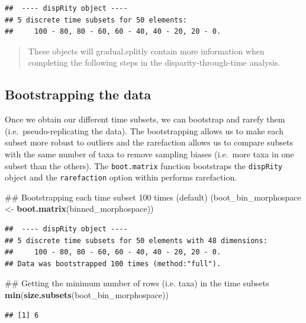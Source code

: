 \documentclass[]{book}
\newenvironment{Shaded}{\begin{snugshade}}{\end{snugshade}}
\newcommand{\KeywordTok}[1]{\textcolor[rgb]{0.13,0.29,0.53}{\textbf{#1}}}
\newcommand{\StringTok}[1]{\textcolor[rgb]{0.31,0.60,0.02}{#1}}
\newcommand{\NormalTok}[1]{#1}
\theoremstyle{definition}
\theoremstyle{definition}
\theoremstyle{definition}
\theoremstyle{remark}
\begin{document}
\begin{verbatim}
##  ---- dispRity object ---- 
## 5 discrete time subsets for 50 elements:
##     100 - 80, 80 - 60, 60 - 40, 40 - 20, 20 - 0.
\end{verbatim}

\begin{quote}
These objects will gradual.splitly contain more information when
completing the following steps in the disparity-through-time analysis.
\end{quote}

\subsection{Bootstrapping the data}\label{bootstrapping-the-data}

Once we obtain our different time subsets, we can bootstrap and rarefy
them (i.e.~pseudo-replicating the data). The bootstrapping allows us to
make each subset more robust to outliers and the rarefaction allows us
to compare subsets with the same number of taxa to remove sampling
biases (i.e.~more taxa in one subset than the others). The
\texttt{boot.matrix} function bootstraps the \texttt{dispRity} object
and the \texttt{rarefaction} option within performs rarefaction.

\begin{Shaded}
\begin{Highlighting}[]
\NormalTok{## Bootstrapping each time subset 100 times (default)}
\NormalTok{(boot_bin_morphospace <-}\StringTok{ }\KeywordTok{boot.matrix}\NormalTok{(binned_morphospace))}
\end{Highlighting}
\end{Shaded}

\begin{verbatim}
##  ---- dispRity object ---- 
## 5 discrete time subsets for 50 elements with 48 dimensions:
##     100 - 80, 80 - 60, 60 - 40, 40 - 20, 20 - 0.
## Data was bootstrapped 100 times (method:"full").
\end{verbatim}

\begin{Shaded}
\begin{Highlighting}[]
\NormalTok{## Getting the minimum number of rows (i.e. taxa) in the time subsets}
\KeywordTok{min}\NormalTok{(}\KeywordTok{size.subsets}\NormalTok{(boot_bin_morphospace))}
\end{Highlighting}
\end{Shaded}

\begin{verbatim}
## [1] 6
\end{verbatim}
\end{document}
